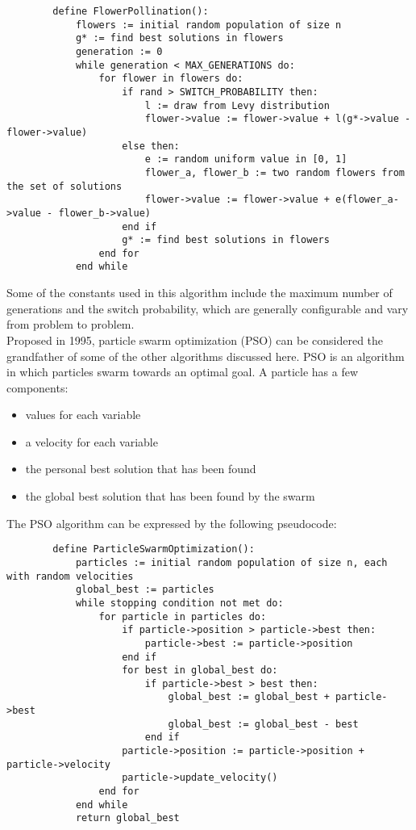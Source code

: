 \documentclass{article}
\begin{document}
    \begin{lstlisting}
        define FlowerPollination():
            flowers := initial random population of size n
            g* := find best solutions in flowers
            generation := 0
            while generation < MAX_GENERATIONS do:
                for flower in flowers do:
                    if rand > SWITCH_PROBABILITY then:
                        l := draw from Levy distribution
                        flower->value := flower->value + l(g*->value - flower->value)
                    else then:
                        e := random uniform value in [0, 1]
                        flower_a, flower_b := two random flowers from the set of solutions
                        flower->value := flower->value + e(flower_a->value - flower_b->value)
                    end if
                    g* := find best solutions in flowers
                end for
            end while
    \end{lstlisting}\cite{Nabil} \cite{AroraAnand}
    Some of the constants used in this algorithm include the maximum number of generations and the switch probability, which are generally configurable and vary 
    from problem to problem. \\
    Proposed in 1995, particle swarm optimization (PSO) can be considered the grandfather of some of the other algorithms discussed here. PSO is an algorithm in 
    which particles swarm towards an optimal goal. A particle has a few components:
    \begin{itemize}
        \item values for each variable
        \item a velocity for each variable
        \item the personal best solution that has been found
        \item the global best solution that has been found by the swarm
    \end{itemize}
    The PSO algorithm can be expressed by the following pseudocode:
    \begin{lstlisting}
        define ParticleSwarmOptimization():
            particles := initial random population of size n, each with random velocities
            global_best := particles
            while stopping condition not met do:
                for particle in particles do:
                    if particle->position > particle->best then:
                        particle->best := particle->position
                    end if 
                    for best in global_best do:
                        if particle->best > best then:
                            global_best := global_best + particle->best
                            global_best := global_best - best
                        end if
                    particle->position := particle->position + particle->velocity
                    particle->update_velocity()
                end for
            end while
            return global_best
    \end{lstlisting}
\end{document}
